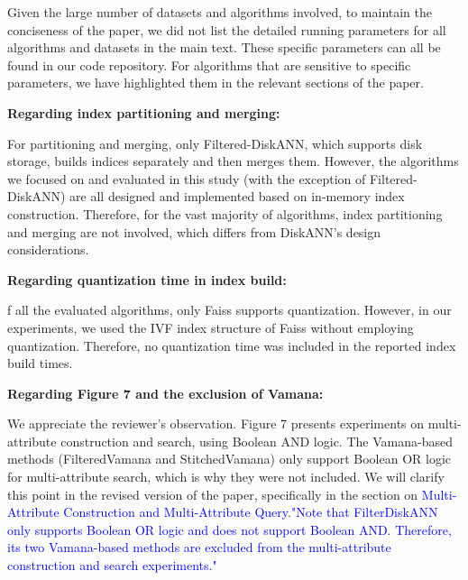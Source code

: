 \documentclass[sigconf, nonacm]{acmart}
\newcounter{detailed}[section]
\begin{document}
 Given the large number of datasets and algorithms involved, to maintain the conciseness of the paper, we did not list the detailed running parameters for all algorithms and datasets in the main text. These specific parameters can all be found in our code repository. For algorithms that are sensitive to specific parameters, we have highlighted them in the relevant sections of the paper.
 
\textbf{Regarding index partitioning and merging:}

For partitioning and merging, only Filtered-DiskANN, which supports disk storage, builds indices separately and then merges them. However, the algorithms we focused on and evaluated in this study (with the exception of Filtered-DiskANN) are all designed and implemented based on in-memory index construction. Therefore, for the vast majority of algorithms, index partitioning and merging are not involved, which differs from DiskANN's design considerations.

\textbf{Regarding quantization time in index build:}

f all the evaluated algorithms, only Faiss supports quantization. However, in our experiments, we used the IVF index structure of Faiss without employing quantization. Therefore, no quantization time was included in the reported index build times.

\textbf{Regarding Figure 7 and the exclusion of Vamana:}

We appreciate the reviewer’s observation. Figure 7 presents experiments on multi-attribute construction and search, using Boolean AND logic. The Vamana-based methods (FilteredVamana and StitchedVamana) only support Boolean OR logic for multi-attribute search, which is why they were not included. We will clarify this point in the revised version of the paper, specifically in the section on \textcolor{blue}{Multi-Attribute Construction and Multi-Attribute Query}.\textcolor{blue}{"Note that FilterDiskANN only supports Boolean OR logic and does not support Boolean AND. Therefore, its two Vamana-based methods are excluded from the multi-attribute construction and search experiments."}
\end{document}

